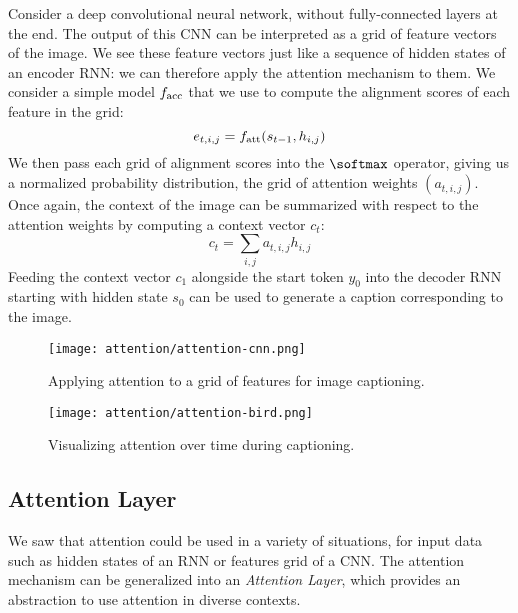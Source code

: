 Consider a deep convolutional neural network, without fully-connected layers at the end. The output of this CNN can be interpreted as a grid of feature vectors of the image. We see these feature vectors just like a sequence of hidden states of an encoder RNN: we can therefore apply the attention mechanism to them. We consider a simple model $f_{\textnormal{acc}}$ that we use to compute the alignment scores of each feature in the grid:
\begin{equation*}
    e_{t,i,j} = f_{\textnormal{att}}(s_{t-1}, h_{i,j})
\end{equation*}
We then pass each grid of alignment scores into the $\softmax$ operator, giving us a normalized probability distribution, the grid of attention weights $(a_{t,i,j})$. Once again, the context of the image can be summarized with respect to the attention weights by computing a context vector $c_t$:
\begin{equation*}
    c_t = \sum_{i,j} a_{t,i,j} h_{i,j}
\end{equation*} 
Feeding the context vector $c_1$ alongside the start token $y_0$ into the decoder RNN starting with hidden state $s_0$ can be used to generate a caption corresponding to the image.
\begin{figure}[H]
    \centering
    \texttt{[image: attention/attention-cnn.png]}
    \caption{Applying attention to a grid of features for image captioning.}
\end{figure}

\begin{figure}[H]
    \centering
    \texttt{[image: attention/attention-bird.png]}
    \caption{Visualizing attention over time during captioning.\protect\footnotemark}
\end{figure}

\subsection{Attention Layer}
We saw that attention could be used in a variety of situations, for input data such as hidden states of an RNN or features grid of a CNN. The attention mechanism can be generalized into an \emph{Attention Layer}, which provides an abstraction to use attention in diverse contexts.

